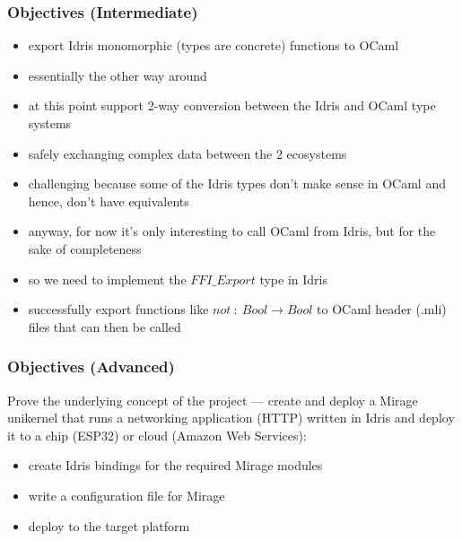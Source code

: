 \documentclass{beamer}
\begin{document}
\begin{frame}
	\frametitle{Objectives (Intermediate)}

	\begin{itemize}
		\item export Idris monomorphic (types are concrete) functions
		      to OCaml
		      \pause
		\item essentially the other way around
		      \pause
		\item at this point support 2-way conversion between
		      the Idris and OCaml type systems
		      \pause
		\item safely exchanging complex data between the 2 ecosystems
		      \pause
		\item challenging because some of the Idris types don't make
		      sense in OCaml and hence, don't have equivalents
		      \pause
		\item anyway, for now it's only interesting to call OCaml
		      from Idris, but for the sake of completeness
		      \pause
		\item so we need to implement the $FFI\_Export$ type in Idris
		      \pause
		\item successfully export functions like
		      $not \ : \ Bool \rightarrow Bool$ to OCaml header (.mli)
		      files that can then be called
	\end{itemize}
\end{frame}


\begin{frame}
	\frametitle{Objectives (Advanced)}

	Prove the underlying concept of the project --- create and deploy a Mirage unikernel that runs a networking
	application (HTTP) written in Idris and deploy it to a chip (ESP32) or cloud (Amazon Web Services):
	\pause

	\begin{itemize}
		\item create Idris bindings for the required Mirage modules
		      \pause
		\item write a configuration file for Mirage
		      \pause
		\item deploy to the target platform
	\end{itemize}
\end{frame}
\end{document}
